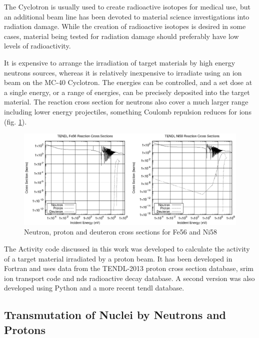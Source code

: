 The Cyclotron is usually used to create radioactive isotopes for medical use, but an additional beam line has been devoted to material science investigations into radiation damage.  While the creation of radioactive isotopes is desired in some cases, material being tested for radiation damage should preferably have low levels of radioactivity.

It is expensive to arrange the irradiation of target materials by high energy neutrons sources, whereas it is relatively inexpensive to irradiate using an ion beam on the MC-40 Cyclotron.  The energies can be controlled, and a set dose at a single energy, or a range of energies, can be precisely deposited into the target material.  The reaction cross section for neutrons also cover a much larger range including lower energy projectiles, something Coulomb repulsion reduces for ions (fig. \ref{fig:fe56ni58xs}).

\begin{figure}[tbp]
  \begin{center}
    \includegraphics[width=.7\linewidth]{chapters/isotope_activation_and_radioactive_decay/plots/npd_xs/fe56_ni58_xs.eps}
    \caption{Neutron, proton and deuteron cross sections for Fe56 and Ni58}
    \label{fig:fe56ni58xs}
  \end{center}
\end{figure}

The Activity code discussed in this work was developed to calculate the activity of a target material irradiated by a proton beam.  It has been developed in Fortran and uses data from the TENDL-2013 proton cross section database, \acrshort{srim} ion transport code and \acrlong{nds} radioactive decay database.  A second version was also developed using Python and a more recent \acrshort{tendl} database.


\FloatBarrier




\subsection{Transmutation of Nuclei by Neutrons and Protons}

